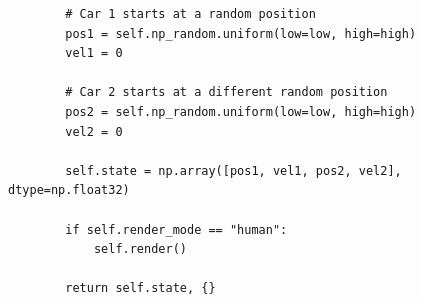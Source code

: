\documentclass[citestyle=gb7714-2015, bibstyle=gb7714-2015,lang=cn,14pt,scheme=chinese]{elegantbook}
\begin{document}
\begin{verbatim}
        # Car 1 starts at a random position
        pos1 = self.np_random.uniform(low=low, high=high)
        vel1 = 0

        # Car 2 starts at a different random position
        pos2 = self.np_random.uniform(low=low, high=high)
        vel2 = 0

        self.state = np.array([pos1, vel1, pos2, vel2], dtype=np.float32)

        if self.render_mode == "human":
            self.render()

        return self.state, {}
\end{verbatim}
\end{document}
